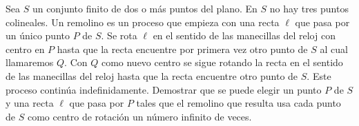 Sea $S$ un conjunto finito de dos o más puntos del plano. En $S$ no hay tres puntos colineales. Un remolino es un proceso que empieza con una recta $\ell$ que pasa por un único punto $P$ de $S$. Se rota $\ell$ en el sentido de las manecillas del reloj con centro en $P$ hasta que la recta encuentre por primera vez otro punto de $S$ al cual llamaremos $Q$. Con $Q$ como nuevo centro se sigue rotando la recta en el sentido de las manecillas del reloj hasta que la recta encuentre otro punto de $S$. Este proceso continúa indefinidamente. \newline 
Demostrar que se puede elegir un punto $P$ de $S$ y una recta $\ell$ que pasa por $P$ tales que el remolino que resulta usa cada punto de $S$ como centro de rotación un número infinito de veces.